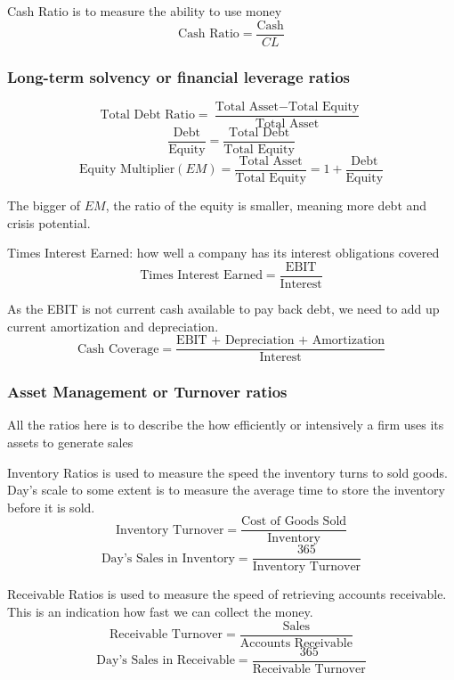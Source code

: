 \documentclass[10pt, a4paper]{article}
\begin{document}
        Cash Ratio is to measure the ability to use money 
        $$\text{Cash\ Ratio} = \frac{\text{Cash}}{CL}$$

        \subsubsection{Long-term  solvency or financial leverage ratios}
        $$\text{Total\ Debt\ Ratio} = \frac{\text{Total\ Asset} - \text{Total\ Equity}}{\text{Total\ Asset}}$$
        $$\frac{\text{Debt}}{\text{Equity}} = \frac{\text{Total\ Debt}}{\text{Total\ Equity}}$$
        $$\text{Equity\ Multiplier} (EM) = \frac{\text{Total\ Asset}}{\text{Total\ Equity}} = 1 + \frac{\text{Debt}}{\text{Equity}}$$

        The bigger of $EM$, the ratio of the equity is smaller, meaning more debt and crisis potential. 

        Times Interest Earned: how well a company has its interest obligations covered
        $$\text{Times\ Interest\ Earned} = \frac{\text{EBIT}}{\text{Interest}}$$
        
        As the EBIT is not current cash available to pay back debt, we need to add up current amortization and depreciation.
        $$\text{Cash\ Coverage} = \frac{\text{EBIT + Depreciation + Amortization}}{\text{Interest}}$$
        
        
        \subsubsection{Asset Management or Turnover  ratios}
        
        All the ratios here is to describe the how efficiently or intensively a firm uses its assets to generate sales 

        Inventory Ratios is used to measure the speed the inventory turns to sold goods. Day's scale to some extent is to measure the average time to store the inventory before it is sold.
            $$\text{Inventory\ Turnover} = \frac{\text{Cost\ of\ Goods\ Sold}}{\text{Inventory}}$$
            $$\text{Day's\ Sales\ in\ Inventory} = \frac{365}{\text{Inventory\ Turnover}}$$
        
        Receivable Ratios is used to measure the speed of retrieving accounts receivable. This is an indication how fast we can collect the money.
            $$\text{Receivable Turnover} = \frac{\text{Sales}}{\text{Accounts\ Receivable}}$$
            $$\text{Day's\ Sales\ in\ Receivable} = \frac{365}{\text{Receivable\ Turnover}}$$
\end{document}
